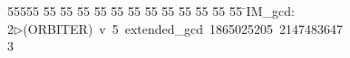 %
%
\begin{tabbing}
55555 \= 55 \= 55 \= 55 \= 55 \= 55 \= 55 \= 55 \= 55 \= 55 \= 55 \= 55 \= 55 \= \>IM\_gcd:\\[0pt]
2\>$\triangleright$\>(ORBITER)\ v\ 5\ extended\_gcd\ 1865025205\ 2147483647\\[0pt]
3\>\end{tabbing}
